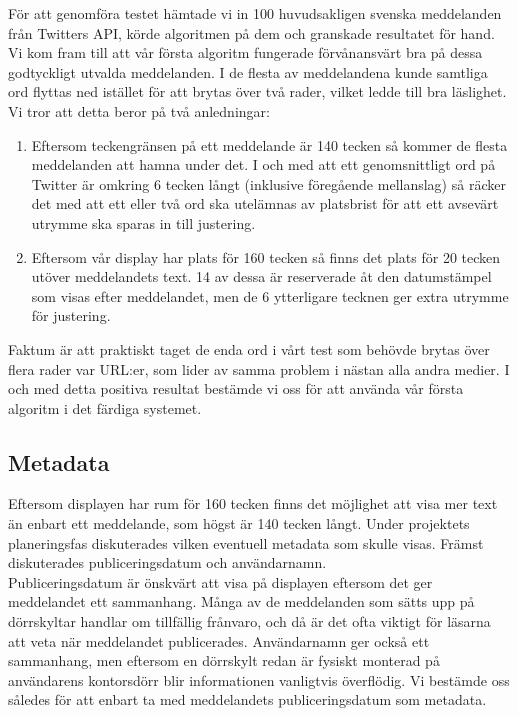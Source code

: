 \documentclass[a4paper,11pt]{article}
\begin{document}
För att genomföra testet hämtade vi in 100 huvudsakligen svenska meddelanden från Twitters API, körde algoritmen på dem och granskade resultatet för hand. Vi kom fram till att vår första algoritm fungerade förvånansvärt bra på dessa godtyckligt utvalda meddelanden. I de flesta av meddelandena kunde samtliga ord flyttas ned istället för att brytas över två rader, vilket ledde till bra läslighet. Vi tror att detta beror på två anledningar:

	\begin{enumerate}
    	\item Eftersom teckengränsen på ett meddelande är 140 tecken så kommer de flesta meddelanden att hamna under det. I och med att ett genomsnittligt ord på Twitter är omkring 6 tecken långt (inklusive föregående mellanslag) så räcker det med att ett eller två ord ska utelämnas av platsbrist för att ett avsevärt utrymme ska sparas in till justering.
    	\item Eftersom vår display har plats för 160 tecken så finns det plats för 20 tecken utöver meddelandets text. 14 av dessa är reserverade åt den datumstämpel som visas efter meddelandet, men de 6 ytterligare tecknen ger extra utrymme för justering.
    	\end{enumerate}


Faktum är att praktiskt taget de enda ord i vårt test som behövde brytas över flera rader var URL:er, som lider av samma problem i nästan alla andra medier. I och med detta positiva resultat bestämde vi oss för att använda vår första algoritm i det färdiga systemet.

\subsection{Metadata}
Eftersom displayen har rum för 160 tecken finns det möjlighet att visa mer text än enbart ett meddelande, som högst är 140 tecken långt. Under projektets planeringsfas diskuterades vilken eventuell metadata som skulle visas. Främst diskuterades publiceringsdatum och användarnamn. \\

Publiceringsdatum är önskvärt att visa på displayen eftersom det ger meddelandet ett sammanhang. Många av de meddelanden som sätts upp på dörrskyltar handlar om tillfällig frånvaro, och då är det ofta viktigt för läsarna att veta när meddelandet publicerades. Användarnamn ger också ett sammanhang, men eftersom en dörrskylt redan är fysiskt monterad på användarens kontorsdörr blir informationen vanligtvis överflödig. Vi bestämde oss således för att enbart ta med meddelandets publiceringsdatum som metadata.
\end{document}

